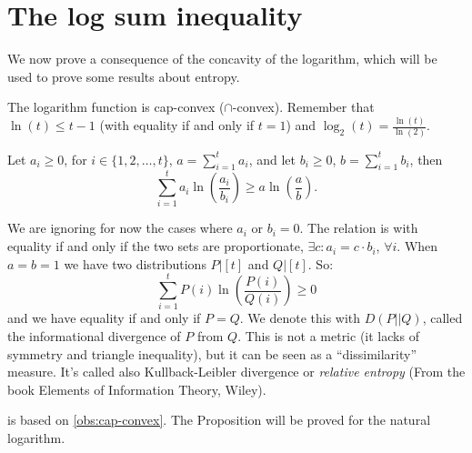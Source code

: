 \chapter{The log sum inequality}

We now prove a consequence of the concavity of the logarithm, which will be used to prove some results about entropy.

\begin{obs} \label{obs:cap-convex}
	The logarithm function is cap-convex ($\cap$-convex).
	Remember that $\ln(t) \le t - 1$ (with equality if and only if $t=1$) and $\log_2(t) = \frac{\ln(t)}{\ln(2)}$.
\end{obs}

\begin{prop}\label{prop:logsum}
	Let $a_i \ge 0$, for $i \in \{1, 2, \dots, t\}$, $a = \sum_{i = 1}^t a_i$, and let $b_i \ge 0$, $b = \sum_{i = 1}^t b_i$, then 
	\begin{equation*}
		\sum_{i = 1}^t a_i \ln \left( \frac{a_i}{b_i} \right)
		\ge
		a \ln \left( \frac{a}{b} \right).
	\end{equation*}
\end{prop}

We are ignoring for now the cases where $a_i$ or $b_i = 0$.
The relation is with equality if and only if the two sets are proportionate, \ie $\exists c : a_i = c \cdot b_i$, $\forall i$.
When $a = b = 1$ we have two distributions $P|[t]$ and $Q|[t]$.
So:
\begin{equation*}
	\sum_{i = 1}^t P(i) \ln \left( \frac{P(i)}{Q(i)} \right) \ge 0
\end{equation*}
and we have equality if and only if $P = Q$.
We denote this with $D(P||Q)$, called the informational divergence of $P$ from $Q$.
This is not a metric (it lacks of symmetry and triangle inequality), but it can be seen as a ``dissimilarity'' measure.
It's called also Kullback-Leibler divergence or \emph{relative entropy} (From the book Elements of Information Theory, Wiley). 
 
  is based on \cref{obs:cap-convex}.
 The Proposition will be proved for the natural logarithm.
 
